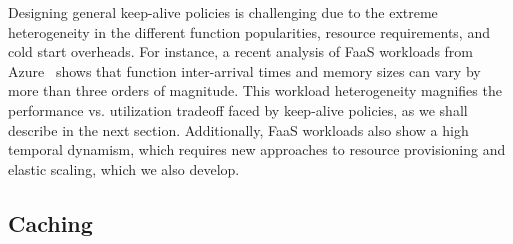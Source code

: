 Designing general keep-alive policies is challenging due to the extreme heterogeneity in the different function popularities, resource requirements, and cold start overheads.
For instance, a recent analysis of FaaS workloads from Azure~\cite{shahrad_serverless_2020} shows that function inter-arrival times and memory sizes can vary by more than three orders of magnitude. 
%
This workload heterogeneity magnifies the performance vs. utilization tradeoff faced by keep-alive policies, as we shall describe in the next section. 
Additionally, FaaS workloads also show a high temporal dynamism, which requires new approaches to resource provisioning and elastic scaling, which we also develop. 








\subsection{Caching}
\vspace*{\subsecspace}


